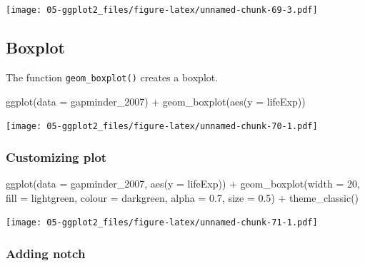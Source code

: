 \documentclass[
]{book}
\newenvironment{Shaded}{\begin{snugshade}}{\end{snugshade}}
\newcommand{\AttributeTok}[1]{\textcolor[rgb]{0.77,0.63,0.00}{#1}}
\newcommand{\DecValTok}[1]{\textcolor[rgb]{0.00,0.00,0.81}{#1}}
\newcommand{\FloatTok}[1]{\textcolor[rgb]{0.00,0.00,0.81}{#1}}
\newcommand{\FunctionTok}[1]{\textcolor[rgb]{0.00,0.00,0.00}{#1}}
\newcommand{\NormalTok}[1]{#1}
\newcommand{\SpecialCharTok}[1]{\textcolor[rgb]{0.00,0.00,0.00}{#1}}
\newcommand{\StringTok}[1]{\textcolor[rgb]{0.31,0.60,0.02}{#1}}
\begin{document}
\texttt{[image: 05-ggplot2\_files/figure-latex/unnamed-chunk-69-3.pdf]}

\hypertarget{boxplot}{%
\subsection{Boxplot}\label{boxplot}}

The function \texttt{geom\_boxplot()} creates a boxplot.

\begin{Shaded}
\begin{Highlighting}[]
\FunctionTok{ggplot}\NormalTok{(}\AttributeTok{data =}\NormalTok{ gapminder\_2007) }\SpecialCharTok{+} 
   \FunctionTok{geom\_boxplot}\NormalTok{(}\FunctionTok{aes}\NormalTok{(}\AttributeTok{y =}\NormalTok{ lifeExp))}
\end{Highlighting}
\end{Shaded}

\texttt{[image: 05-ggplot2\_files/figure-latex/unnamed-chunk-70-1.pdf]}

\hypertarget{customizing-plot-3}{%
\subsubsection{Customizing plot}\label{customizing-plot-3}}

\begin{Shaded}
\begin{Highlighting}[]
\FunctionTok{ggplot}\NormalTok{(}\AttributeTok{data =}\NormalTok{ gapminder\_2007, }\FunctionTok{aes}\NormalTok{(}\AttributeTok{y =}\NormalTok{ lifeExp)) }\SpecialCharTok{+} 
   \FunctionTok{geom\_boxplot}\NormalTok{(}\AttributeTok{width =} \DecValTok{20}\NormalTok{, }
                \AttributeTok{fill =} \StringTok{\textquotesingle{}lightgreen\textquotesingle{}}\NormalTok{, }
                \AttributeTok{colour =} \StringTok{\textquotesingle{}darkgreen\textquotesingle{}}\NormalTok{, }
                \AttributeTok{alpha =} \FloatTok{0.7}\NormalTok{,}
                \AttributeTok{size =} \FloatTok{0.5}\NormalTok{) }\SpecialCharTok{+}
   \FunctionTok{theme\_classic}\NormalTok{()}
\end{Highlighting}
\end{Shaded}

\texttt{[image: 05-ggplot2\_files/figure-latex/unnamed-chunk-71-1.pdf]}

\hypertarget{adding-notch}{%
\subsubsection{Adding notch}\label{adding-notch}}
\end{document}
